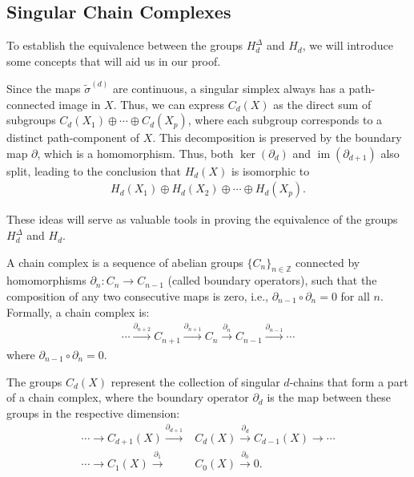 \subsection{Singular Chain Complexes}
\label{SingularChainComplexes}
To establish the equivalence between the groups \( H_{d}^{\Delta} \) and \( H_{d} \), we will introduce some concepts that will aid us in our proof.

Since the maps \( \tilde{\sigma}^{(d)} \) are continuous, a singular simplex always has a path-connected image in \( X \). Thus, we can express \( C_{d}(X) \) as the direct sum of subgroups \( C_{d}(X_{1}) \oplus \cdots \oplus C_{d}(X_{p}) \), where each subgroup corresponds to a distinct path-component of \( X \). This decomposition is preserved by the boundary map \( \partial \), which is a homomorphism. Thus, both \( \ker(\partial_{d}) \) and \( \operatorname{im}(\partial_{d+1}) \) also split, leading to the conclusion that \( H_{d}(X) \) is isomorphic to
\begin{align}
H_{d}(X_{1}) \oplus H_{d}(X_{2}) \oplus \cdots \oplus H_{d}(X_{p}).
\end{align}

These ideas will serve as valuable tools in proving the equivalence of the groups \( H_{d}^{\Delta} \) and \( H_{d} \).

\begin{definition}
A chain complex is a sequence of abelian groups \(\{C_n\}_{n \in \mathbb{Z}}\) connected by homomorphisms \(\partial_n: C_n \to C_{n-1}\) (called boundary operators), such that the composition of any two consecutive maps is zero, i.e., \(\partial_{n-1} \circ \partial_n = 0\) for all \(n\). Formally, a chain complex is:
\begin{align}
\cdots \xrightarrow{\partial_{n+2}} C_{n+1} \xrightarrow{\partial_{n+1}} C_n \xrightarrow{\partial_n} C_{n-1} \xrightarrow{\partial_{n-1}} \cdots
\end{align}
where \(\partial_{n-1} \circ \partial_n = 0\).
\end{definition}

\begin{example}
	The groups $C_{d}(X)$ represent the collection of singular $d$-chains that form
	a part of a chain complex, where the boundary operator $\partial_{d}$ is the map between these groups in the respective dimension:
	\begin{align}
		\cdots \xrightarrow{}C_{d+1}(X) \xrightarrow{\partial_{d+1}} & C_{d}(X) \xrightarrow{\partial_d}C_{d-1}(X) \xrightarrow{}\cdots \\
		\cdots \xrightarrow{}C_{1}(X) \xrightarrow{\partial_1}       & C_{0}(X) \xrightarrow{\partial_0}0.
	\end{align}
\end{example}

